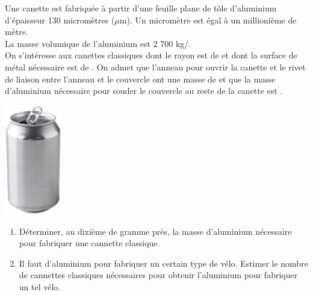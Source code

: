 \begin{exercice}[CRPE 2018 G2] %
   Une canette est fabriquée à partir d’une feuille plane de tôle d’aluminium d’épaisseur 130 micromètres ($\mu$m). Un micromètre est égal à un millionième de mètre. \\
   La masse volumique de l’aluminium est 2 700 kg/\umc{}. \\
   On s’intéresse aux canettes classiques dont le rayon est de  et dont la surface de métal nécessaire est de . On admet que l’anneau pour ouvrir la canette et le rivet de liaison entre l’anneau et le couvercle ont une masse de  et que la masse d’aluminium nécessaire pour souder le couvercle au reste de la canette est .
    \begin{center}
      \includegraphics[width=2.5cm]{Grandeurs_mesures/Images/M14_ex_canette}
   \end{center}
   \begin{enumerate}
      \item Déterminer, au dixième de gramme près, la masse d’aluminium nécessaire pour fabriquer une cannette classique.
      \item Il faut  d’aluminium pour fabriquer un certain type de vélo. Estimer le nombre de cannettes classiques nécessaires pour obtenir l’aluminium pour fabriquer un tel vélo.
   \end{enumerate}
\end{exercice}

